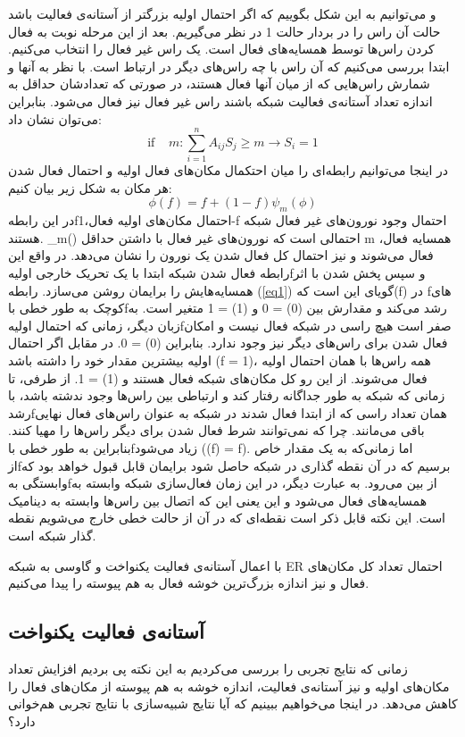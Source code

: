 و می‌توانیم به این شکل بگوییم که اگر احتمال اولیه بزرگتر از آستانه‌ی فعالیت باشد حالت آن راس را در بردار حالت 1 در نظر می‌گیریم.
بعد از این مرحله نوبت به فعال کردن راس‌ها توسط همسایه‌های فعال است. یک راس غیر فعال را انتخاب می‌کنیم. ابتدا بررسی می‌کنیم که آن راس با چه راس‌های دیگر در ارتباط است. با نظر به آنها و شمارش راس‌هایی که از میان آنها فعال هستند، در صورتی که تعدادشان حداقل به اندازه تعداد آستانه‌ی فعالیت شبکه باشند راس غیر فعال نیز فعال می‌شود. بنابراین می‌توان نشان داد:  
\begin{equation}
\text{if}~~~~~m: \sum_{i=1}^{n} A_{ij}S_{j}\geq m \longrightarrow S_{i} = 1
\end{equation}
در اینجا می‌توانیم رابطه‌ای را میان احتکمال مکان‌های فعال اولیه و احتمال‌ فعال شدن هر مکان به شکل زیر بیان کنیم:
\begin{equation} 
\phi(f) = f + (1-f)\psi_{m}(\phi) \label{eq1}
\end{equation}
در این رابطهfاحتمال مکان‌های اولیه فعال،1-f احتمال وجود نورون‌های غیر فعال شبکه هستند. \psi_{m}(\phi) احتمالی است که نورون‌های غیر فعال با داشتن حداقل m همسایه فعال، فعال می‌شوند و \phi نیز احتمال کل فعال شدن یک نورون را نشان می‌دهد. در واقع این رابطه فعال شدن شبکه ابتدا با یک تحریک خارجی اولیهfو سپس پخش شدن با اثر همسایه‌هایش را برایمان روشن می‌سازد. رابطه (\ref{eq1}) گویای این است که\phi(f) در fهای کوچک  به طور خطی باfرشد می‌کند و مقدارش بین  \phi(0) = 0 و \phi(1) = 1 متغیر است.
 به زبان دیگر، زمانی که احتمال اولیهfصفر است هیچ راسی در شبکه فعال نیست و امکان فعال شدن برای راس‌های دیگر نیز وجود ندارد. بنابراین \phi(0) = 0. در مقابل اگر احتمال اولیه بیشترین مقدار خود را داشته باشد (f = 1)، همه راس‌ها با همان احتمال اولیه فعال می‌شوند. از این رو کل مکان‌های شبکه فعال هستند و \phi(1) = 1. از طرفی، تا زمانی که شبکه به طور جداگانه رفتار کند و ارتباطی بین راس‌ها وجود ندشته باشد، با رشدfهمان تعداد راسی که از ابتدا فعال شدند در شبکه به عنوان  راس‌های فعال نهایی باقی می‌مانند. چرا که نمی‌توانند شرط فعال شدن برای دیگر  راس‌ها را مهیا کنند. بنابراین 
 \phi به طور خطی باfزیاد می‌شود (\phi(f) = f). اما زمانی‌‌که به یک مقدار خاص ازfبرسیم که در آن نقطه گذاری در شبکه حاصل شود برایمان قابل قبول خواهد بود که وابستگی بهfاز بین می‌رود. به عبارت دیگر، در این زمان فعال‌سازی شبکه وابسته به همسایه‌های فعال می‌شود و این یعنی این که اتصال بین راس‌ها وابسته به دینامیک است. این نکته قابل ذکر است نقطه‌ای که در آن  از حالت خطی خارج می‌شویم نقطه گذار شبکه است.

با اعمال  آستانه‌ی فعالیت یکنواخت و گاوسی به شبکه ER احتمال تعداد کل مکان‌های فعال و نیز اندازه بزرگ‌ترین خوشه فعال به هم پیوسته را پیدا می‌کنیم.
\subsection{آستانه‌ی فعالیت یکنواخت}
زمانی که نتایج تجربی را بررسی می‌کردیم به این نکته پی بردیم افزایش تعداد مکان‌های اولیه و  نیز آستانه‌ی فعالیت، اندازه خوشه به هم پیوسته از مکان‌های فعال را کاهش می‌دهد. در اینجا می‌خواهیم ببینیم که آیا نتایج شبیه‌سازی با نتایج تجربی هم‌خوانی دارد؟

